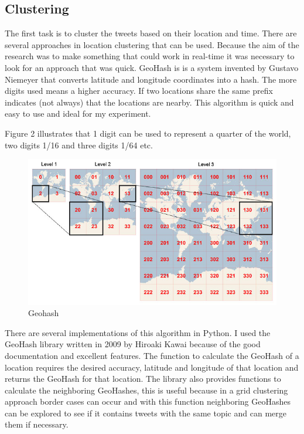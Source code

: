 \documentclass[
10pt, %
a4paper, %
oneside, %
headinclude,footinclude, %
BCOR5mm, %
]{scrartcl}
\begin{document}
\subsection{Clustering}
The first task is to cluster the tweets based on their location and time. There are several approaches in location clustering that can be used. Because the aim of the research was to make something that could work in real-time it was necessary to look for an approach that was quick. GeoHash is is a system invented by Gustavo Niemeyer that converts latitude and longitude coordinates into a hash. The more digits used means a higher accuracy. If two locations share the same prefix indicates (not always) that the locations are nearby. This algorithm is quick and easy to use and ideal for my experiment.

Figure 2 illustrates that 1 digit can be used to represent a quarter of the world, two digits 1/16 and three digits 1/64 etc. 
\begin{figure}[htbp] %
   \centering
   \includegraphics[width=4.5in]{geohash.jpg} 
   \caption{Geohash}
   \label{fig:geohash}
\end{figure}

There are several implementations of this algorithm in Python. I used the GeoHash library written in 2009 by Hiroaki Kawai because of the good documentation and excellent features. The function to calculate the GeoHash of a location requires the desired accuracy, latitude and longitude of that location and returns the GeoHash for that location. The library also provides functions to calculate the neighboring GeoHashes, this is useful because in a grid clustering approach border cases can occur and with this function neighboring GeoHashes can be explored to see if it contains tweets with the same topic and can merge them if necessary. 
\end{document}
